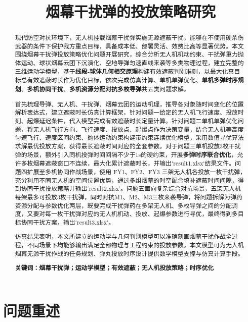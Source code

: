\documentclass[12pt,a4paper]{article}
\title{烟幕干扰弹的投放策略研究}
\date{}  %
\begin{document}
	\maketitle
	\begin{abstract}
	现代防空对抗环境下，无人机挂载烟幕干扰弹实施无源遮蔽干扰，能够在不使用硬杀伤武器的条件下保护我方重点目标，具备成本低、部署灵活、效费比高\cite{wei2026}等显著优势。本文围绕烟幕干扰弹投放策略优化问题开展研究\cite{cai2026}，综合分析无人机机动约束、干扰弹重力抛体运动、球状烟幕云团下沉演化、空地导弹匀速直线来袭等多类物理过程，建立完整的三维运动学模型，基于\textbf{线段‑球体几何相交原理}构建有效遮蔽判别准则，以最大化真目标总有效遮蔽时长作为优化目标，依次完成仿真计算、单机单弹优化、\textbf{单机多弹时序规划}、\textbf{多机协同干扰}、\textbf{多机资源分配对抗多枚导弹}共五类问题求解。
	
	首先梳理导弹、无人机、干扰弹、烟幕云团的运动机理，推导各对象随时间变化的位置解析表达式，建立遮蔽时长仿真计算框架，针对问题一给定的无人机飞行速度、投放时刻、起爆延迟条件，代入模型完成有效遮蔽时长定量计算。针对问题二单机单弹优化问题，将无人机飞行方向、飞行速度、投放点、起爆点作为决策变量，结合无人机等高度匀速飞行、速度区间约束、抛体运动约束构建带约束连续优化模型，采用数值寻优算法求解最优投放方案，获得最长遮蔽时间对应的全套参数。对于问题三单机投放3枚干扰弹的场景，额外引入同机投弹时间间隔不少于1s的硬约束，开展\textbf{多弹时序联合优化}，允许多枚烟幕遮蔽窗口不连续，最大化累计遮蔽时长，并输出`result1.xlsx`结果文件。问题四扩展至多机协同作战场景，使用 FY1、FY2、FY3 三架无人机各投放一枚干扰弹，充分利用不同无人机的空间位置优势，通过多组烟幕的时空配合填补遮蔽时间间隙，得到协同干扰投放策略并输出`result2.xlsx`。问题五面向复杂综合对抗场景，五架无人机每架最多可投放3枚干扰弹，同时对抗M1、M2、M3三枚来袭导弹，将问题拆解为弹药资源分配与参数优化两层，既要完成干扰弹药在多架无人机、多枚导弹之间的分配调度，又要对每一枚干扰弹对应的无人机机动、投放、起爆参数进行寻优，最终得到多目标协同干扰方案，输出`result3.xlsx`。
	
	仿真结果表明，本文所建立的运动学与几何判别模型可以准确刻画烟幕干扰作战全过程，不同场景下均能够输出满足全部物理与工程约束的投放参数。本文模型可为无人机烟幕无源干扰作战的任务规划、弹丸投放时序设计提供数学模型支撑与仿真计算手段。

		
		\noindent\textbf{关键词：}\textbf{烟幕干扰弹；运动学模型；有效遮蔽；无人机投放策略；时序优化}
	\end{abstract}
	
	\newpage %
	
	\section{问题重述}
	
\end{document}
